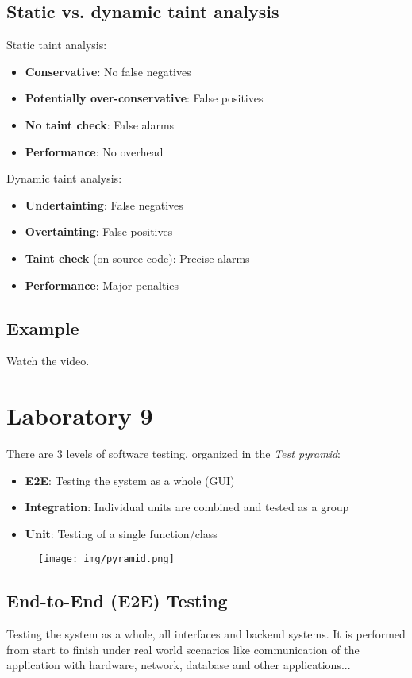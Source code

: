 \documentclass[a4paper, 10pt, titlepage]{article}
\begin{document}
\subsection{Static vs. dynamic taint analysis}
Static taint analysis:
\begin{itemize}
\item \textbf{Conservative}: No false negatives
\item \textbf{Potentially over-conservative}: False positives
\item \textbf{No taint check}: False alarms
\item \textbf{Performance}: No overhead
\end{itemize}
Dynamic taint analysis:
\begin{itemize}
\item \textbf{Undertainting}: False negatives
\item \textbf{Overtainting}: False positives
\item \textbf{Taint check} (on source code): Precise alarms
\item \textbf{Performance}: Major penalties
\end{itemize}

\subsection{Example}
Watch the video.

\newpage
\section{Laboratory 9}
There are 3 levels of software testing, organized in the \textit{Test pyramid}:
\begin{itemize}
\item \textbf{E2E}: Testing the system as a whole (GUI)
\item \textbf{Integration}: Individual units are combined and tested as a group
\item \textbf{Unit}: Testing of a single function/class
\end{itemize}
\begin{figure}[h]
\centering
\texttt{[image: img/pyramid.png]}
\end{figure}
\subsection*{End-to-End (E2E) Testing}
Testing the system as a whole, all interfaces and backend systems.
It is performed from start to finish under real world scenarios like communication of the application with hardware, network, database and other applications...
\end{document}

